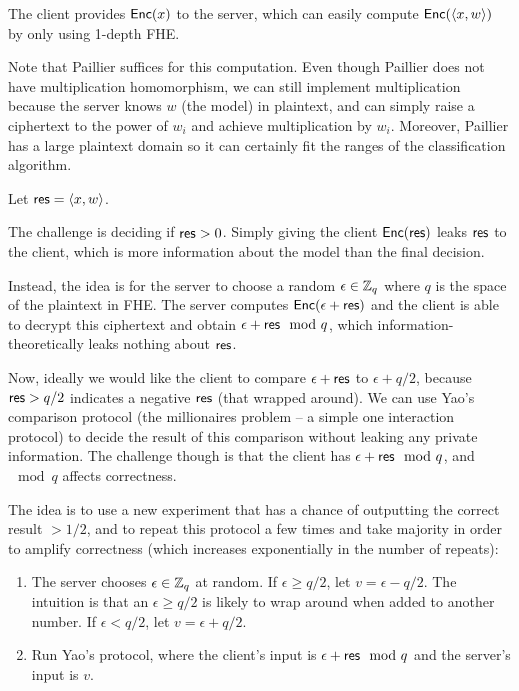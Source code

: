 \documentclass[11pt]{article}
\begin{document}
The client provides $\mathsf{Enc}(x)$ to the server, which can easily compute
$\mathsf{Enc}(\langle x, w \rangle)$ by only using 1-depth FHE. 

Note that Paillier suffices for this computation. Even though Paillier does not have multiplication homomorphism, we can still implement
multiplication because the server knows $w$ (the model) in plaintext, and can simply raise a ciphertext to the power of $w_i$ and achieve multiplication by $w_i$. Moreover, Paillier has a large plaintext domain so it can certainly fit the ranges of the classification algorithm. 

Let $\mathsf{res} = \langle x,
w \rangle$.

The challenge is deciding if $\mathsf{res} > 0$. Simply giving the client $\mathsf{Enc}(\mathsf{res})$ leaks $\mathsf{res}$ to the client, which is more information about the model than the final decision.

Instead, the idea is for the server to choose a random $\epsilon \in {\mathbb Z}_q$ where $q$ is the space of the plaintext in FHE. The server computes $\mathsf{Enc}(\epsilon + \mathsf{res})$ and the client is able to decrypt this ciphertext and obtain $\epsilon + \mathsf{res} \mod q$, which information-theoretically leaks nothing about $\mathsf{res}$.

Now, ideally we would like the client to compare $\epsilon + \mathsf{res}$ to $\epsilon + q/2$, because $\mathsf{res} > q/2$ indicates a negative $\mathsf{res}$ (that wrapped around). We can use Yao's comparison protocol (the millionaires problem -- a simple one interaction protocol) to decide the result of this comparison without leaking any private information. The challenge though is that the client has $\epsilon + \mathsf{res} \mod q$, and $\mod q$ affects correctness.

The idea is to use a new experiment that has a chance of outputting the correct result $>1/2$, and to repeat this protocol a few times and take majority in order to amplify correctness (which increases exponentially in the number of repeats):

\newcommand{\eps}{\epsilon}

\begin{enumerate}
\item
    The server chooses $\epsilon \in {\mathbb Z}_q$ at random. If $\epsilon \geq q/2$,
    let $v = \eps - q/2$. The intuition is that an $\eps \geq q/2$ is likely to
    wrap around when added to another number. If $\eps < q/2$, let $v = \eps +
    q/2$.
\item Run Yao's protocol, where the client's input is $\eps + \res \mod q$ and the server's input is $v$.
\end{enumerate}
\end{document}
